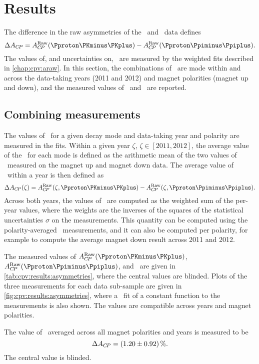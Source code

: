 \chapter{Results}
\label{chap:cpv:results}

The difference in the raw asymmetries of the \pKK\ and \ppipi\ data defines 
\dACP
\begin{equation*}
  \dACP = \ARaw(\pKK) - \ARaw(\ppipi).
\end{equation*}
The values of, and uncertainties on, \ARaw\ are measured by the weighted fits 
described in \cref{chap:cpv:araw}.
In this section, the combinations of \ARaw\ are made within and across the 
data-taking years (2011 and 2012) and magnet polarities (magnet up and down), 
and the measured values of \ARaw\ and \dACP\ are reported.

\section{Combining measurements}
\label{chap:cpv:results:combination}

The values of \ARaw\ for a given decay mode and data-taking year and polarity 
are measured in the fits.
Within a given year $\zeta$, $\zeta \in [2011, 2012]$, the average value of the 
\ARaw\ for each mode is defined as the arithmetic mean of the two values of 
\ARaw\ measured on the magnet up and magnet down data.
The average value of \dACP\ within a year is then defined as
\begin{equation}
  \dACP(\zeta) = \ARaw(\zeta, \pKK) - \ARaw(\zeta, \ppipi).
\end{equation}
Across both years, the values of \ARaw\ are computed as the weighted sum of the 
per-year values, where the weights are the inverses of the squares of the 
statistical uncertainties $\sigma$ on the measurements.
This quantity can be computed using the polarity-averaged \ARaw\ measurements, 
and it can also be computed per polarity, for example to compute the average 
magnet down result across 2011 and 2012.

The measured values of $\ARaw(\pKK)$, $\ARaw(\ppipi)$, and \dACP\ are given in 
\cref{tab:cpv:results:asymmetries}, where the central values are blinded.
Plots of the three measurements for each data sub-sample are given in 
\cref{fig:cpv:results:asymmetries}, where a \chisq\ fit of a constant function 
to the measurements is also shown.
The values are compatible across years and magnet polarities.

The value of \dACP\ averaged across all magnet polarities and years is measured 
to be
\begin{equation*}
  \dACP = \deltaACP.
  \label{eqn:cpv:results:dacp}
\end{equation*}
The central value is blinded.

